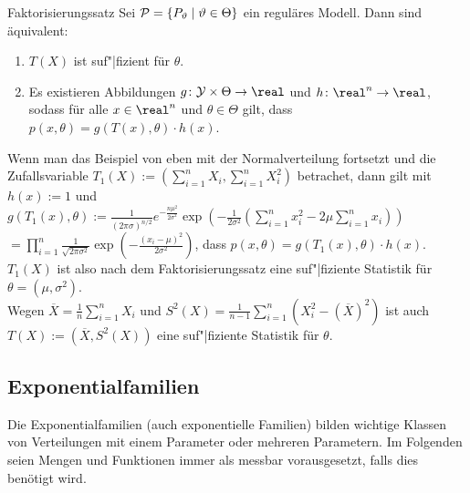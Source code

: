 \begin{Satz}{Faktorisierungssatz}
    Sei $\P = \{P_\theta \;|\; \theta \in \Theta\}$ ein reguläres Modell.
    Dann sind äquivalent:
    \begin{enumerate}
        \item
        $T(X)$ ist suf"|fizient für $\theta$.
        
        \item
        Es existieren Abbildungen $g\colon \Y \times \Theta \rightarrow \real$
        und $h\colon \real^n \rightarrow \real$, sodass
        für alle $x \in \real^n$ und $\theta \in \Theta$ gilt, dass
        $p(x, \theta) = g(T(x), \theta) \cdot h(x)$.
    \end{enumerate}
\end{Satz}

\linie

\begin{Bsp}
    Wenn man das Beispiel von eben mit der Normalverteilung fortsetzt und die Zufallsvariable
    $T_1(X) := (\sum_{i=1}^n X_i, \sum_{i=1}^n X_i^2)$ betrachet,
    dann gilt mit $h(x) := 1$ und\\
    $g(T_1(x), \theta) := \frac{1}{(2\pi\sigma)^{n/2}} e^{-\frac{n\mu^2}{2\sigma^2}}
    \exp\!\left(-\frac{1}{2\sigma^2}
    \left(\sum_{i=1}^n x_i^2 - 2\mu \sum_{i=1}^n x_i\right)\right)$\\
    $= \prod_{i=1}^n \frac{1}{\sqrt{2\pi\sigma^2}}
    \exp\!\left(-\frac{(x_i - \mu)^2}{2\sigma^2}\right)$, dass
    $p(x, \theta) = g(T_1(x), \theta) \cdot h(x)$.\\
    $T_1(X)$ ist also nach dem Faktorisierungssatz eine suf"|fiziente Statistik für
    $\theta = (\mu, \sigma^2)$.\\
    Wegen $\overline{X} = \frac{1}{n} \sum_{i=1}^n X_i$ und
    $S^2(X) = \frac{1}{n-1} \sum_{i=1}^n (X_i^2 - (\overline{X})^2)$ ist auch
    $T(X) := (\overline{X}, S^2(X))$ eine suf"|fiziente Statistik für $\theta$.
\end{Bsp}

\subsection{%
    Exponentialfamilien%
}

\begin{Bem}
    Die Exponentialfamilien (auch exponentielle Familien) bilden wichtige Klassen von Verteilungen
    mit einem Parameter oder mehreren Parametern.
    Im Folgenden seien Mengen und Funktionen immer als messbar vorausgesetzt, falls dies
    benötigt wird.
\end{Bem}

